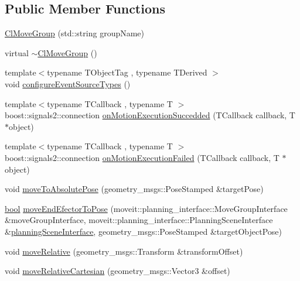 \subsection*{Public Member Functions}
\begin{DoxyCompactItemize}
\item 
\hyperlink{classsm__moveit_1_1cl__movegroup_1_1ClMoveGroup_a996b92fda56d04827995d6a012430f36}{Cl\+Move\+Group} (std\+::string group\+Name)
\item 
virtual \hyperlink{classsm__moveit_1_1cl__movegroup_1_1ClMoveGroup_a4b467d3ba8ede975c2de956037932c82}{$\sim$\+Cl\+Move\+Group} ()
\item 
{\footnotesize template$<$typename T\+Object\+Tag , typename T\+Derived $>$ }\\void \hyperlink{classsm__moveit_1_1cl__movegroup_1_1ClMoveGroup_a5e90b33e031149241eaa4159304f3009}{configure\+Event\+Source\+Types} ()
\item 
{\footnotesize template$<$typename T\+Callback , typename T $>$ }\\boost\+::signals2\+::connection \hyperlink{classsm__moveit_1_1cl__movegroup_1_1ClMoveGroup_a5359b864e258cb51d0d7ff7ffc615b58}{on\+Motion\+Execution\+Succedded} (T\+Callback callback, T $\ast$object)
\item 
{\footnotesize template$<$typename T\+Callback , typename T $>$ }\\boost\+::signals2\+::connection \hyperlink{classsm__moveit_1_1cl__movegroup_1_1ClMoveGroup_a6c869d27e767840b9ac437d838394c79}{on\+Motion\+Execution\+Failed} (T\+Callback callback, T $\ast$object)
\item 
void \hyperlink{classsm__moveit_1_1cl__movegroup_1_1ClMoveGroup_a6b85fe06800db92b08346603e5d2eabb}{move\+To\+Absolute\+Pose} (geometry\+\_\+msgs\+::\+Pose\+Stamped \&target\+Pose)
\item 
\hyperlink{classbool}{bool} \hyperlink{classsm__moveit_1_1cl__movegroup_1_1ClMoveGroup_a63291ecb539af417046c2bcb1227aebf}{move\+End\+Efector\+To\+Pose} (moveit\+::planning\+\_\+interface\+::\+Move\+Group\+Interface \&move\+Group\+Interface, moveit\+::planning\+\_\+interface\+::\+Planning\+Scene\+Interface \&\hyperlink{classsm__moveit_1_1cl__movegroup_1_1ClMoveGroup_a26b5c9e0aef1cd67ee977a756b69cf76}{planning\+Scene\+Interface}, geometry\+\_\+msgs\+::\+Pose\+Stamped \&target\+Object\+Pose)
\item 
void \hyperlink{classsm__moveit_1_1cl__movegroup_1_1ClMoveGroup_ad0352e787798f020d24ba9c1c58413bb}{move\+Relative} (geometry\+\_\+msgs\+::\+Transform \&transform\+Offset)
\item 
void \hyperlink{classsm__moveit_1_1cl__movegroup_1_1ClMoveGroup_ad5ca2f92076405346319aa20e5d4dffb}{move\+Relative\+Cartesian} (geometry\+\_\+msgs\+::\+Vector3 \&offset)
\end{DoxyCompactItemize}
